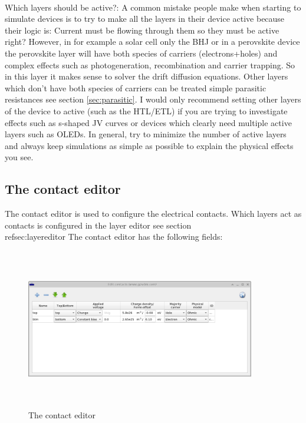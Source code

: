
\\

Which layers should be active?: A common mistake people make when starting to simulate devices is to try to make all the layers in their device active because their logic is: Current must be flowing through them so they must be active right?  However, in for example a solar cell only the BHJ or in a perovskite device the perovskite layer will have both species of carriers (electrons+holes) and complex effects such as photogeneration, recombination and carrier trapping. So in this layer it makes sense to solver the drift diffusion equations.  Other layers which don't have both species of carriers can be treated simple parasitic resistances see section \ref{sec:parasitic}. I would only recommend setting other layers of the device to active (such as the HTL/ETL) if you are trying to investigate effects such as s-shaped JV curves or devices which clearly need multiple active layers such as OLEDs. In general, try to minimize the number of active layers and always keep simulations as simple as possible to explain the physical effects you see.  

\newpage
\subsection{The contact editor}
\label{sec:contacteditor}
The contact editor is used to configure the electrical contacts.  Which layers act as contacts is configured in the layer editor see section \\ref{sec:layereditor}  The contact editor has the following fields:

\begin{figure}[H]
\centering
\includegraphics[width=100mm,height=70mm]{./images/contact_editor.png}
\caption{The contact editor}
\label{fig:contacteditor}
\end{figure}

